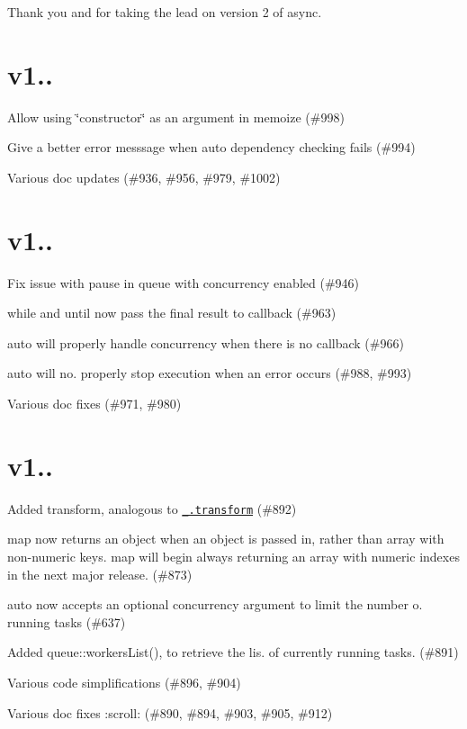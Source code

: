 Thank you \href{github.com/aearly}{\tt {\bfseries }} and \href{github.com/megawac}{\tt {\bfseries }} for taking the lead on version 2 of async. 



\section*{v1..}


\begin{DoxyItemize}
\item Allow using {\ttfamily \char`\"{}constructor\char`\"{}} as an argument in {\ttfamily memoize} (\#998)
\item Give a better error messsage when {\ttfamily auto} dependency checking fails (\#994)
\item Various doc updates (\#936, \#956, \#979, \#1002)
\end{DoxyItemize}

\section*{v1..}


\begin{DoxyItemize}
\item Fix issue with {\ttfamily pause} in {\ttfamily queue} with concurrency enabled (\#946)
\item {\ttfamily while} and {\ttfamily until} now pass the final result to callback (\#963)
\item {\ttfamily auto} will properly handle concurrency when there is no callback (\#966)
\item {\ttfamily auto} will no. properly stop execution when an error occurs (\#988, \#993)
\item Various doc fixes (\#971, \#980)
\end{DoxyItemize}

\section*{v1..}


\begin{DoxyItemize}
\item Added {\ttfamily transform}, analogous to \href{http://lodash.com/docs#transform}{\tt {\ttfamily \+\_\+.\+transform}} (\#892)
\item {\ttfamily map} now returns an object when an object is passed in, rather than array with non-\/numeric keys. {\ttfamily map} will begin always returning an array with numeric indexes in the next major release. (\#873)
\item {\ttfamily auto} now accepts an optional {\ttfamily concurrency} argument to limit the number o. running tasks (\#637)
\item Added {\ttfamily queue\+::workers\+List()}, to retrieve the lis. of currently running tasks. (\#891)
\item Various code simplifications (\#896, \#904)
\item Various doc fixes \+:scroll\+: (\#890, \#894, \#903, \#905, \#912)
\end{DoxyItemize}

